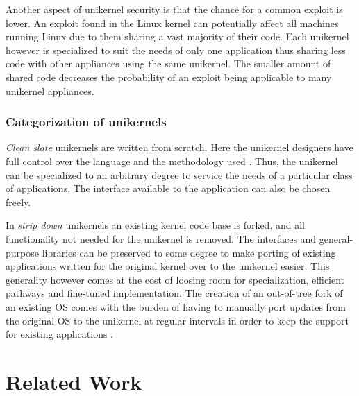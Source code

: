 \documentclass[10pt,twocolumn,a4paper]{article}
\begin{document}
      Another aspect of unikernel security is that the chance for a common exploit is lower.
      An exploit found in the Linux kernel can potentially affect all machines running Linux
      due to them sharing a vast majority of their code.
      Each unikernel however is specialized to suit the needs of only one application thus
      sharing less code with other appliances using the same unikernel.
      The smaller amount of shared code decreases the probability of an exploit being applicable
      to many unikernel appliances.

    \subsubsection{Categorization of unikernels}\label{sec:categories-of-unikernels}
      \textit{Clean slate} unikernels are written from scratch.
      Here the unikernel designers have full control over the language
      and the methodology used \cite{raza19}.
      Thus, the unikernel can be specialized to an arbitrary degree to service the needs
      of a particular class of applications.
      The interface available to the application can also be chosen freely.

      In \textit{strip down} unikernels an existing kernel code base is forked,
      and all functionality not needed for the unikernel is removed.
      The interfaces and general-purpose libraries can be preserved to some degree
      to make porting of existing applications written for the original kernel
      over to the unikernel easier. 
      This generality however comes at the cost of loosing room for specialization,
      efficient pathways and fine-tuned implementation.
      The creation of an out-of-tree fork of an existing OS comes with the burden of
      having to manually port updates from the original OS to the unikernel at regular intervals
      in order to keep the support for existing applications \cite{raza19}.
      
\section{Related Work}\label{sec:relwork} 
\end{document}
